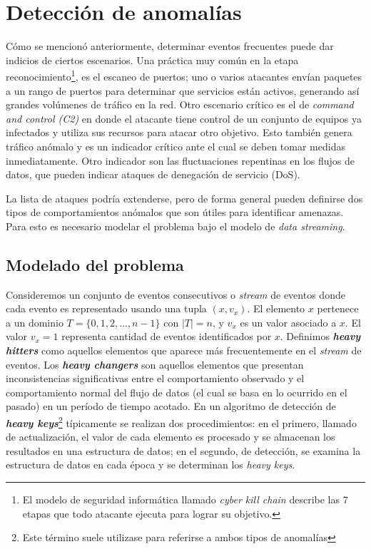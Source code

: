 \documentclass[a4paper,10pt, oneside]{article}
\begin{document}
\section{Detección de anomalías}
Cómo se mencionó anteriormente, determinar eventos frecuentes puede dar indicios de ciertos escenarios. Una práctica muy común en la etapa reconocimiento\footnote{El modelo de seguridad informática llamado \textit{cyber kill chain} describe las 7 etapas que todo atacante ejecuta para lograr su objetivo.\cite{hutchins2011intelligence}}, es el escaneo de puertos; uno o varios atacantes envían paquetes a un rango de puertos para determinar que servicios están activos, generando así grandes volúmenes de tráfico en la red. Otro escenario crítico es el de \textit{command and control (C2)} en donde el atacante tiene control de un conjunto de equipos ya infectados y utiliza sus recursos para atacar otro objetivo. Esto también genera tráfico anómalo y es un indicador crítico ante el cual se deben tomar medidas inmediatamente. Otro indicador son las fluctuaciones repentinas en los flujos de datos, que pueden indicar ataques de denegación de servicio (DoS).

La lista de ataques podría extenderse, pero de forma general pueden definirse dos tipos de comportamientos anómalos que son útiles para identificar amenazas. Para esto es necesario modelar el problema bajo el modelo de \textit{data streaming}.

\subsection{Modelado del problema}\label{modelado}

Consideremos un conjunto de eventos consecutivos o \textit{stream} de eventos donde cada evento es representado usando una tupla $(x, v_x)$. El elemento $x$ pertenece a un dominio $T=\{0,1,2, \dots, n-1\}$ con $|T|=n$, y $v_x$ es un valor asociado a $x$. El valor $v_x=1$ representa cantidad de eventos identificados por $x$. Definimos \textbf{\textit{heavy hitters}} como aquellos elementos que aparece más frecuentemente en el \textit{stream} de eventos. Los \textbf{\textit{heavy changers}} son aquellos elementos que presentan inconsistencias significativas entre el comportamiento observado y el comportamiento normal del flujo de datos (el cual se basa en lo ocurrido en el pasado) en un período de tiempo acotado\cite{Tong:2016:HTS:2927964.2927977}. 
En un algoritmo de detección de \textbf{\textit{heavy keys}}\footnote{Este término suele utilizase para referirse a ambos tipos de anomalías} típicamente se realizan dos procedimientos: en el primero, llamado de actualización, el valor de cada elemento es procesado y se almacenan los resultados en una estructura de datos; en el segundo, de detección, se examina la estructura de datos en cada época y se determinan los \textit{heavy keys}.
\end{document}
